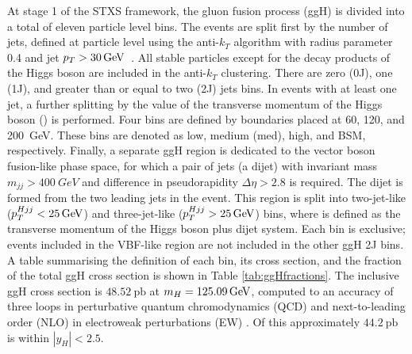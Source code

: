 At stage 1 of the STXS framework, 
the gluon fusion process (ggH) is divided into a total of eleven particle level bins.
The events are split first by the number of jets, 
defined at particle level using the anti-$k_T$ algorithm with radius parameter 0.4 
and jet $p_T > \SI{30}{GeV}$~\cite{AntiKt}.
All stable particles except for the decay products of the Higgs boson 
are included in the anti-$k_T$ clustering.
There are zero (0J), one (1J), and greater than or equal to two (2J) jets bins.
In events with at least one jet, a further splitting 
by the value of the transverse momentum of the Higgs boson (\ptH) is performed. 
Four bins are defined by boundaries placed at 60, 120, and \SI{200}{GeV}.
These bins are denoted as low, medium (med), high, and BSM, respectively.
Finally, a separate ggH region is dedicated to the vector boson fusion-like phase space, 
for which a pair of jets (a dijet) with invariant mass $m_{jj} > \SI{400}{GeV}$ 
and difference in pseudorapidity $\Delta\eta > 2.8$ is required.
The dijet is formed from the two leading jets in the event.
This region is split into two-jet-like ($p_T^{Hjj} < \SI{25}{GeV}$) 
and three-jet-like ($p_T^{Hjj} > \SI{25}{GeV}$) bins, 
where \ptHjj is defined as the transverse momentum of the Higgs boson plus dijet system.
Each bin is exclusive; events included in the VBF-like region are not included in the other ggH 2J bins.
A table summarising the definition of each bin, its cross section, and the fraction of the 
total ggH cross section is shown in Table \ref{tab:ggHfractions}.
The inclusive ggH cross section is $48.52~\textrm{pb}$ at $m_{H} = \SI{125.09}{GeV}$, 
computed to an accuracy of three loops in perturbative quantum chromodynamics (QCD) 
and next-to-leading order (NLO) in electroweak perturbations (EW) 
\cite{YR4,Anastasiou2015,Anastasiou2016}.
Of this approximately $44.2~\textrm{pb}$ is within $|y_H| < 2.5$.

